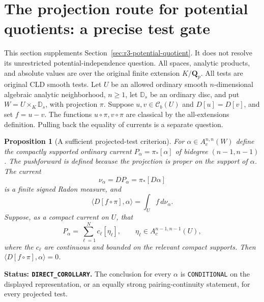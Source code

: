 \documentclass[11pt,a4paper]{article}
\numberwithin{equation}{section}
\newtheorem{proposition}[theorem]{Proposition}
\theoremstyle{definition}
\theoremstyle{remark}
\newcommand{\Cb}{\mathcal C_b}
\begin{document}


\section{The projection route for potential quotients: a precise test gate}
\label{sec:r3-potential-quotient-projection}

This section supplements Section~\ref{sec:r3-potential-quotient}.
It does not resolve its unrestricted potential-independence question.
All spaces, analytic products, and absolute values are over the original
finite extension $K/\mathbf Q_p$. All tests are original CLD smooth tests.
Let $U$ be an allowed ordinary smooth $n$-dimensional algebraic
analytic neighborhood, $n\geq1$, let $\mathbb D_s$ be an ordinary
disc, and put $W=U\times_K\mathbb D_s$, with projection $\pi$.
Suppose $u,v\in\Cb(U)$ and $D[u]=D[v]$, and set $f=u-v$.
The functions $u\circ\pi,v\circ\pi$ are classical by the
all-extensions definition. Pulling back the equality of currents is
a separate question.

\begin{proposition}[A sufficient projected-test criterion]
\label{prop:r3-projection-continuous-coefficients}
For $\alpha\in A_c^{n,n}(W)$ define the compactly supported
ordinary current $P_\alpha=\pi_*[\alpha]$ of bidegree $(n-1,n-1)$.
The pushforward is defined because the projection is proper on the
support of $\alpha$. The current
\[
 \nu_\alpha=DP_\alpha=\pi_*[D\alpha]
\]
is a finite signed Radon measure, and
\begin{equation}\label{eq:r3-projection-exact-reduction}
 \langle D[f\circ\pi],\alpha\rangle
       =\int_U f\,d\nu_\alpha.
\end{equation}
Suppose, as a compact current on $U$, that
\[
 P_\alpha=\sum_{\ell=1}^N c_\ell[\eta_\ell],\qquad
 \eta_\ell\in A_c^{n-1,n-1}(U),
\]
where the $c_\ell$ are continuous and bounded on the relevant
compact supports. Then $\langle D[f\circ\pi],\alpha\rangle=0$.
\end{proposition}

\noindent\textbf{Status: \texttt{DIRECT\_COROLLARY}.}
The conclusion for every $\alpha$ is \texttt{CONDITIONAL} on the
displayed representation, or an equally strong pairing-continuity
statement, for every projected test.
\end{document}
